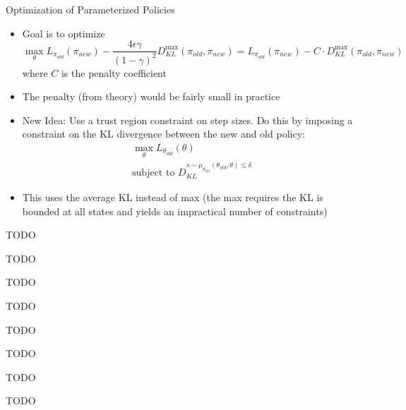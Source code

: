 \documentclass[aspectratio=169]{../latex_main/tntbeamer}  %
\begin{document}
\begin{frame}[c]{Optimization of Parameterized Policies}
	
    \begin{itemize}
        \item Goal is to optimize
        $$\max_{\theta}  L_{\pi_{old}} (\pi_{new}) -  \frac{4\epsilon\gamma}{(1-\gamma)^2} D_{KL}^{\max}(\pi_{old}, \pi_{new}) = L_{\pi_{old}} (\pi_{new}) -  C \cdot D_{KL}^{\max}(\pi_{old}, \pi_{new}) $$
        where $C$ is the penalty coefficient
        \item The penalty (from theory) would be fairly small in practice
        \medskip
        \item New Idea: Use a trust region constraint on step sizes. Do this by imposing a constraint on the KL divergence between the new and old policy:
        \begin{eqnarray}
        \max_{\theta} L_{\theta_{old}} (\theta)\\
        \text{subject to } D_{KL}^{s \sim \mu_{\theta_{old}} (\theta_{old}, \theta) \leq \delta}
        \end{eqnarray}
        \item This uses the average KL instead of max (the max requires the KL is bounded at all states and yields an impractical number of constraints)
    \end{itemize}
    
\end{frame}
\begin{frame}[c]{TODO}
	
    TODO	

\end{frame}
\begin{frame}[c]{TODO}
	
    TODO	

\end{frame}
\begin{frame}[c]{TODO}
	
    TODO	

\end{frame}
\begin{frame}[c]{TODO}
	
    TODO	

\end{frame}

\end{document}

